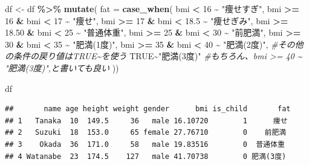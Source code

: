 \documentclass[
]{book}
\newenvironment{Shaded}{\begin{snugshade}}{\end{snugshade}}
\newcommand{\AttributeTok}[1]{\textcolor[rgb]{0.13,0.29,0.53}{#1}}
\newcommand{\CommentTok}[1]{\textcolor[rgb]{0.56,0.35,0.01}{\textit{#1}}}
\newcommand{\ConstantTok}[1]{\textcolor[rgb]{0.56,0.35,0.01}{#1}}
\newcommand{\DecValTok}[1]{\textcolor[rgb]{0.00,0.00,0.81}{#1}}
\newcommand{\FloatTok}[1]{\textcolor[rgb]{0.00,0.00,0.81}{#1}}
\newcommand{\FunctionTok}[1]{\textcolor[rgb]{0.13,0.29,0.53}{\textbf{#1}}}
\newcommand{\NormalTok}[1]{#1}
\newcommand{\OtherTok}[1]{\textcolor[rgb]{0.56,0.35,0.01}{#1}}
\newcommand{\SpecialCharTok}[1]{\textcolor[rgb]{0.81,0.36,0.00}{\textbf{#1}}}
\newcommand{\StringTok}[1]{\textcolor[rgb]{0.31,0.60,0.02}{#1}}
\begin{document}
\begin{Shaded}
\begin{Highlighting}[]
\NormalTok{df }\OtherTok{\textless{}{-}}\NormalTok{ df }\SpecialCharTok{\%\textgreater{}\%} 
  \FunctionTok{mutate}\NormalTok{( }\AttributeTok{fat =} 
           \FunctionTok{case\_when}\NormalTok{(}
\NormalTok{             bmi }\SpecialCharTok{\textless{}} \DecValTok{16} \SpecialCharTok{\textasciitilde{}} \StringTok{"痩せすぎ"}\NormalTok{,}
\NormalTok{             bmi }\SpecialCharTok{\textgreater{}=} \DecValTok{16} \SpecialCharTok{\&}\NormalTok{ bmi }\SpecialCharTok{\textless{}} \DecValTok{17} \SpecialCharTok{\textasciitilde{}} \StringTok{"痩せ"}\NormalTok{,}
\NormalTok{             bmi }\SpecialCharTok{\textgreater{}=} \DecValTok{17} \SpecialCharTok{\&}\NormalTok{ bmi }\SpecialCharTok{\textless{}} \FloatTok{18.5} \SpecialCharTok{\textasciitilde{}} \StringTok{"痩せぎみ"}\NormalTok{,}
\NormalTok{             bmi }\SpecialCharTok{\textgreater{}=} \FloatTok{18.50} \SpecialCharTok{\&}\NormalTok{ bmi }\SpecialCharTok{\textless{}} \DecValTok{25} \SpecialCharTok{\textasciitilde{}} \StringTok{"普通体重"}\NormalTok{,}
\NormalTok{             bmi }\SpecialCharTok{\textgreater{}=} \DecValTok{25} \SpecialCharTok{\&}\NormalTok{ bmi }\SpecialCharTok{\textless{}} \DecValTok{30}  \SpecialCharTok{\textasciitilde{}} \StringTok{"前肥満"}\NormalTok{,}
\NormalTok{             bmi }\SpecialCharTok{\textgreater{}=} \DecValTok{30} \SpecialCharTok{\&}\NormalTok{ bmi }\SpecialCharTok{\textless{}} \DecValTok{35} \SpecialCharTok{\textasciitilde{}} \StringTok{"肥満(1度)"}\NormalTok{,}
\NormalTok{             bmi }\SpecialCharTok{\textgreater{}=} \DecValTok{35} \SpecialCharTok{\&}\NormalTok{ bmi }\SpecialCharTok{\textless{}} \DecValTok{40} \SpecialCharTok{\textasciitilde{}} \StringTok{"肥満(2度)"}\NormalTok{,}
             \CommentTok{\#その他の条件の戻り値はTRUE\textasciitilde{}を使う}
             \ConstantTok{TRUE}\SpecialCharTok{\textasciitilde{}}\StringTok{"肥満(3度)"} \CommentTok{\#もちろん、bmi \textgreater{}= 40 \textasciitilde{} "肥満(3度)",と書いても良い}
\NormalTok{           )) }

\NormalTok{df}
\end{Highlighting}
\end{Shaded}

\begin{verbatim}
##       name age height weight gender      bmi is_child       fat
## 1   Tanaka  10  149.5     36   male 16.10720        1      痩せ
## 2   Suzuki  18  153.0     65 female 27.76710        0    前肥満
## 3    Okada  36  171.0     58   male 19.83516        0  普通体重
## 4 Watanabe  23  174.5    127   male 41.70738        0 肥満(3度)
\end{verbatim}
\end{document}
